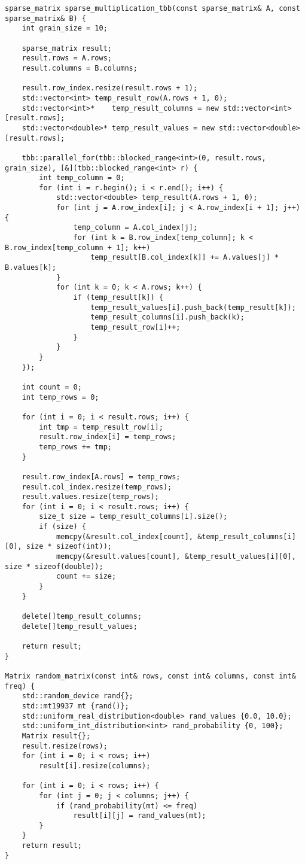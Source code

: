 \documentclass{report}
\begin{document}
\begin{lstlisting}
sparse_matrix sparse_multiplication_tbb(const sparse_matrix& A, const sparse_matrix& B) {
    int grain_size = 10;

    sparse_matrix result;
    result.rows = A.rows;
    result.columns = B.columns;

    result.row_index.resize(result.rows + 1);
    std::vector<int> temp_result_row(A.rows + 1, 0);
    std::vector<int>*    temp_result_columns = new std::vector<int>[result.rows];
    std::vector<double>* temp_result_values = new std::vector<double>[result.rows];

    tbb::parallel_for(tbb::blocked_range<int>(0, result.rows, grain_size), [&](tbb::blocked_range<int> r) {
        int temp_column = 0;
        for (int i = r.begin(); i < r.end(); i++) {
            std::vector<double> temp_result(A.rows + 1, 0);
            for (int j = A.row_index[i]; j < A.row_index[i + 1]; j++) {
                temp_column = A.col_index[j];
                for (int k = B.row_index[temp_column]; k < B.row_index[temp_column + 1]; k++)
                    temp_result[B.col_index[k]] += A.values[j] * B.values[k];
            }
            for (int k = 0; k < A.rows; k++) {
                if (temp_result[k]) {
                    temp_result_values[i].push_back(temp_result[k]);
                    temp_result_columns[i].push_back(k);
                    temp_result_row[i]++;
                }
            }
        }
    });

    int count = 0;
    int temp_rows = 0;

    for (int i = 0; i < result.rows; i++) {
        int tmp = temp_result_row[i];
        result.row_index[i] = temp_rows;
        temp_rows += tmp;
    }

    result.row_index[A.rows] = temp_rows;
    result.col_index.resize(temp_rows);
    result.values.resize(temp_rows);
    for (int i = 0; i < result.rows; i++) {
        size_t size = temp_result_columns[i].size();
        if (size) {
            memcpy(&result.col_index[count], &temp_result_columns[i][0], size * sizeof(int));
            memcpy(&result.values[count], &temp_result_values[i][0], size * sizeof(double));
            count += size;
        }
    }

    delete[]temp_result_columns;
    delete[]temp_result_values;

    return result;
}

Matrix random_matrix(const int& rows, const int& columns, const int& freq) {
    std::random_device rand{};
    std::mt19937 mt {rand()};
    std::uniform_real_distribution<double> rand_values {0.0, 10.0};
    std::uniform_int_distribution<int> rand_probability {0, 100};
    Matrix result{};
    result.resize(rows);
    for (int i = 0; i < rows; i++)
        result[i].resize(columns);

    for (int i = 0; i < rows; i++) {
        for (int j = 0; j < columns; j++) {
            if (rand_probability(mt) <= freq)
                result[i][j] = rand_values(mt);
        }
    }
    return result;
}

\end{lstlisting}
\end{document}
